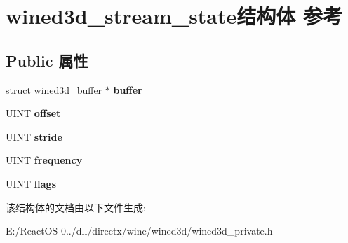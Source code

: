 \hypertarget{structwined3d__stream__state}{}\section{wined3d\+\_\+stream\+\_\+state结构体 参考}
\label{structwined3d__stream__state}
\subsection*{Public 属性}
\begin{DoxyCompactItemize}
\item 
\mbox{\label{structwined3d__stream__state_a42f8344dc0a91dbb6622f7071632769b}} 
\hyperlink{interfacestruct}{struct} \hyperlink{structwined3d__buffer}{wined3d\+\_\+buffer} $\ast$ {\bfseries buffer}
\item 
\mbox{\label{structwined3d__stream__state_aadbedd9f59e2ba4bc391c646be8fd5f1}} 
U\+I\+NT {\bfseries offset}
\item 
\mbox{\label{structwined3d__stream__state_a9d7d91fe7bd2ed5f7deba95ab4303f18}} 
U\+I\+NT {\bfseries stride}
\item 
\mbox{\label{structwined3d__stream__state_a165fd70f871112108b271f3163ee4cc8}} 
U\+I\+NT {\bfseries frequency}
\item 
\mbox{\label{structwined3d__stream__state_a94c3a2885aebe22d828471bf0bc91fdd}} 
U\+I\+NT {\bfseries flags}
\end{DoxyCompactItemize}


该结构体的文档由以下文件生成\+:\begin{DoxyCompactItemize}
\item 
E\+:/\+React\+O\+S-\/0../dll/directx/wine/wined3d/wined3d\+\_\+private.\+h\end{DoxyCompactItemize}
